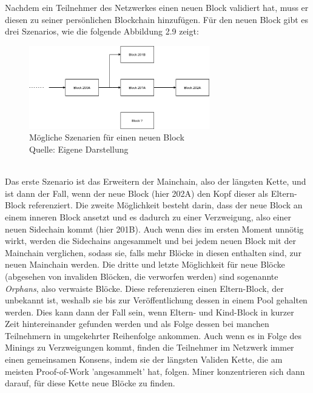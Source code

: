 Nachdem ein Teilnehmer des Netzwerkes einen neuen Block validiert hat, muss er diesen zu seiner persönlichen Blockchain hinzufügen. Für den neuen Block gibt es drei Szenarios, wie die folgende Abbildung 2.9 zeigt:
\begin{figure}[htpb]
	\centering
	\includegraphics[width=0.7\textwidth]{images/chains.png}
	\caption{Mögliche Szenarien für einen neuen Block\\
	Quelle: Eigene Darstellung}
	\label{6braun:fig:chains}
\end{figure}\\
Das erste Szenario ist das Erweitern der Mainchain, also der längsten Kette, und ist dann der Fall, wenn der neue Block (hier 202A) den Kopf dieser als Eltern-Block referenziert.
Die zweite Möglichkeit besteht darin, dass der neue Block an einem inneren Block ansetzt und es dadurch zu einer Verzweigung, also einer neuen Sidechain kommt (hier 201B). Auch wenn dies im ersten Moment unnötig wirkt, werden die Sidechains angesammelt und bei jedem neuen Block mit der Mainchain verglichen, sodass sie, falls mehr Blöcke in diesen enthalten sind, zur neuen Mainchain werden.
Die dritte und letzte Möglichkeit für neue Blöcke (abgesehen von invaliden Blöcken, die verworfen werden) sind sogenannte \emph{Orphans}, also verwaiste Blöcke. Diese referenzieren einen Eltern-Block, der unbekannt ist, weshalb sie bis zur Veröffentlichung dessen in einem Pool gehalten werden. Dies kann dann der Fall sein, wenn Eltern- und Kind-Block in kurzer Zeit hintereinander gefunden werden und als Folge dessen bei manchen Teilnehmern in umgekehrter Reihenfolge ankommen. Auch wenn es in Folge des Minings zu Verzweigungen kommt, finden die Teilnehmer im Netzwerk immer einen gemeinsamen Konsens, indem sie der längsten Validen Kette, die am meisten Proof-of-Work 'angesammelt' hat, folgen. Miner konzentrieren sich dann darauf, für diese Kette neue Blöcke zu finden.\\

